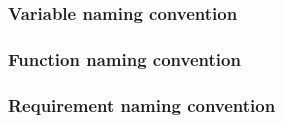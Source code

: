 \subsubsection{Variable naming convention}

\subsubsection{Function naming convention}

\subsubsection{Requirement naming convention}

